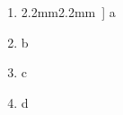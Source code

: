 \documentclass{beamer}
\newcommand{\mysquare}{\rule[0.0mm]{2.2mm}{2.2mm}~}
\newcommand{\mycirc}{\textbullet~}
\begin{document}
\begin{frame}
    \begin{enumerate}[0.1]
        \item[\mysquare] a
        \item[\mycirc] b
        \item[3) ] c
        \item[4) ] d
    \end{enumerate}
\end{frame}
\end{document}

